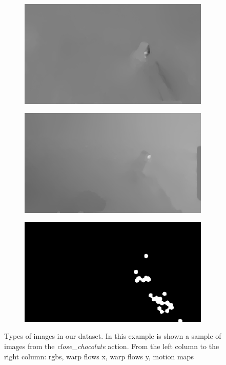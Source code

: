 \documentclass[10pt,twocolumn,hidelinks,letterpaper]{article}
\begin{document}
\begin{figure}
\begin{subfigure}{.24\linewidth}
  \end{subfigure}
  \begin{subfigure}{.24\linewidth}
  	\includegraphics[width=\linewidth]{images/img_comp/flow_x_00020.png}
  \end{subfigure}
  \begin{subfigure}{.24\linewidth}
  	\includegraphics[width=\linewidth]{images/img_comp/flow_y_00020.png}
  \end{subfigure}
  \begin{subfigure}{.24\linewidth}
  	\includegraphics[width=\linewidth]{images/img_comp/map0020.png}
  \end{subfigure}
  \caption{Types of images in our dataset. In this example is shown a sample of images from the \textit{close\_chocolate} action. From the left column to the right column: rgbs, warp flows x, warp flows y, motion maps}
  \label{image_comparison}
\end{figure}
\end{document}
